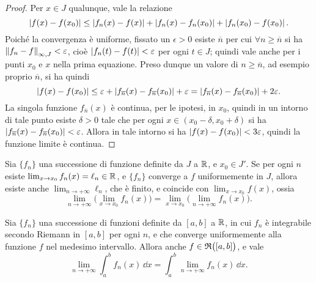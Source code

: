 \begin{proof}
	Per $x\in J$ qualunque, vale la relazione
	\begin{equation}
		\left|{f(x)-f(x_0)}\right|\leq\left|{f_n(x)-f(x)}\right|+\left|{f_n(x)-f_n(x_0)}\right|+\left|{f_n(x_0)-f(x_0)}\right|.
	\end{equation}
	Poiché la convergenza è uniforme, fissato un $\epsilon>0$ esiste $\overline{n}$ per cui $\forall n\geq\overline{n}$ si ha $\left\|{f_n-f}\right\|_{\infty,J}<\varepsilon$, cioè $\left|{f_n(t)-f(t)}\right|<\varepsilon$ per ogni $t\in J$; quindi vale anche per i punti $x_0$ e $x$ nella prima equazione. Preso dunque un valore di $n\geq\overline{n}$, ad esempio proprio $\overline{n}$, si ha quindi
	\begin{equation}
		\left|{f(x)-f(x_0)}\right|\leq\varepsilon+\left|{f_{\overline n}(x)-f_{\overline n}(x_0)}\right|+\varepsilon=\left|{f_{\overline n}(x)-f_{\overline n}(x_0)}\right|+2\varepsilon.
	\end{equation}
	La singola funzione $f_{\overline n}(x)$ è continua, per le ipotesi, in $x_0$, quindi in un intorno di tale punto esiste $\delta>0$ tale che per ogni $x\in(x_0-\delta,x_0+\delta)$ si ha $\left|{f_{\overline n}(x)-f_{\overline n}(x_0)}\right|<\varepsilon$.
	Allora in tale intorno si ha $\left|{f(x)-f(x_0)}\right|<3\varepsilon$, quindi la funzione limite è continua.
\end{proof}
\begin{teorema} \label{t:doppio_limite}
Sia $\{f_n\}$ una successione di funzione definite da $J$ a $\mathbb{R}$, e $x_0\in J'$. Se per ogni $n$ esiste $\lim_{x\to x_0}f_n(x)=\ell_n\in\mathbb{R}$, e $\{f_n\}$ converge a $f$ uniformemente in $J$, allora esiste anche $\lim_{n\to+\infty}\ell_n$, che è finito, e coincide con $\lim_{x\to x_0}f(x)$, ossia
\begin{equation} \label{eq:doppio_limite}
\lim_{n\to+\infty}\Big(\lim_{x\to x_0}f_n(x)\Big)=\lim_{x\to x_0}\Big(\lim_{n\to+\infty}f_n(x)\Big).
\end{equation}
\end{teorema}
\begin{teorema} \label{t:scambio_integrale_limite}
Sia $\{f_n\}$ una successione di funzioni definite da $[a,b]$ a $\mathbb{R}$, in cui $f_n$ è integrabile secondo Riemann in $[a,b]$ per ogni $n$, e che converge uniformemente alla funzione $f$ nel medesimo intervallo. Allora anche $f\in\mathfrak{R}\big([a,b]\big)$, e vale
\begin{equation} \label{eq:scambio_integrale_limite}
\lim_{n\to+\infty}\int_a^bf_n(x)\,\dd x=\int_a^b\lim_{n\to+\infty}f_n(x)\,\dd x.
\end{equation}
\end{teorema}
